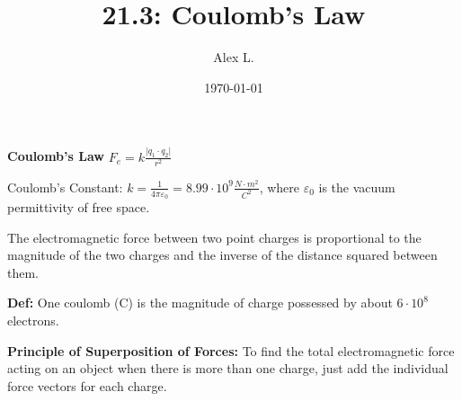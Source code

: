 \documentclass{article}
\title{21.3: Coulomb's Law}
\author{Alex L.}
\date{\today}
\begin{document}
\maketitle

\textbf{Coulomb's Law} $F_e = k \frac{\vert q_1 \cdot q_2 \vert}{r^2}$

Coulomb's Constant: $k = \frac{1}{4 \pi \varepsilon_0} = 8.99 \cdot 10^9 \frac{N \cdot m^2}{C^2}$, where $\varepsilon_0$ is the vacuum permittivity of free space.

The electromagnetic force between two point charges is proportional to the magnitude of the two charges and the inverse of the distance squared between them.

\textbf{Def:} One coulomb (C) is the magnitude of charge possessed by about $6 \cdot 10^8$ electrons.

\textbf{Principle of Superposition of Forces:} To find the total electromagnetic force acting on an object when there is more than one charge, just add the individual force vectors for each charge.
\end{document}
